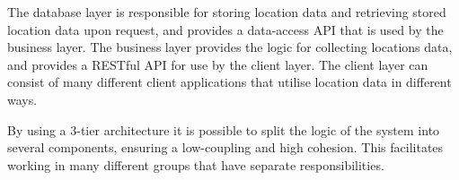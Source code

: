 The database layer is responsible for storing location data and retrieving stored location data upon request, and provides a data-access API that is used by the business layer. The business layer provides the logic for collecting locations data, and provides a RESTful API for use by the client layer. The client layer can consist of many different client applications that utilise location data in different ways.

By using a 3-tier architecture it is possible to split the logic of the system into several components, ensuring a low-coupling and high cohesion. This facilitates working in many different groups that have separate responsibilities. 